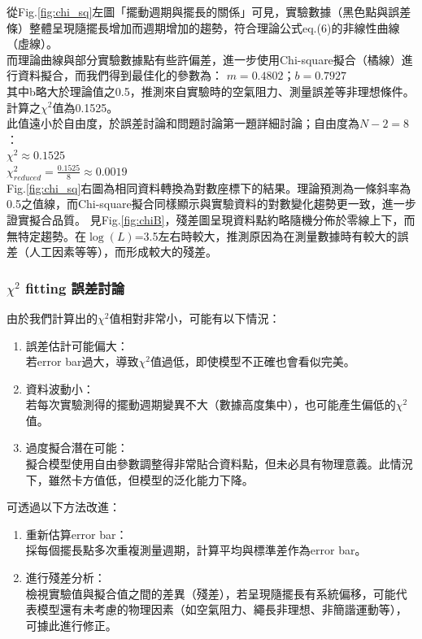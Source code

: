 \documentclass[12pt,a4paper]{article}
\begin{document}
\begin{CJK}{UTF8}{bkai}
\indent 從Fig.\ref{fig:chi_sq}左圖「擺動週期與擺長的關係」可見，實驗數據（黑色點與誤差條）整體呈現隨擺長增加而週期增加的趨勢，符合理論公式eq.(6)的非線性曲線（虛線）。\\
\indent 而理論曲線與部分實驗數據點有些許偏差，進一步使用Chi-square擬合（橘線）進行資料擬合，而我們得到最佳化的參數為：
   $ m=0.4802$；$b=0.7927$\\
\indent 其中b略大於理論值之0.5，推測來自實驗時的空氣阻力、測量誤差等非理想條件。\\
\indent 計算之$\chi^2$值為0.1525。\\
此值遠小於自由度，於誤差討論和問題討論第一題詳細討論；自由度為$N-2=8$：\\
\indent $\chi^2 \approx 0.1525$\\
\indent $\chi_{reduced}^2=\frac{0.1525}{8} \approx 0.0019$\\

\indent Fig.\ref{fig:chi_sq}右圖為相同資料轉換為對數座標下的結果。理論預測為一條斜率為0.5之值線，而Chi-square擬合同樣顯示與實驗資料的對數變化趨勢更一致，進一步證實擬合品質。
\indent 見Fig.\ref{fig:chiB}，殘差圖呈現資料點約略隨機分佈於零線上下，而無特定趨勢。在$\log(L)$=3.5左右時較大，推測原因為在測量數據時有較大的誤差（人工因素等等），而形成較大的殘差。

\subsubsection{$\chi^2$ fitting 誤差討論}
\hfill

\indent 由於我們計算出的$\chi^2$值相對非常小，可能有以下情況：\\

\begin{enumerate}
    \item 誤差估計可能偏大：\\
    若error bar過大，導致$\chi^2$值過低，即使模型不正確也會看似完美。
    \item 資料波動小：\\若每次實驗測得的擺動週期變異不大（數據高度集中），也可能產生偏低的$\chi^2$值。
    \item 過度擬合潛在可能：\\擬合模型使用自由參數調整得非常貼合資料點，但未必具有物理意義。此情況下，雖然卡方值低，但模型的泛化能力下降。
\end{enumerate}

\indent 可透過以下方法改進：
\begin{enumerate}
    \item 重新估算error bar：\\採每個擺長點多次重複測量週期，計算平均與標準差作為error bar。
    \item 進行殘差分析：\\檢視實驗值與擬合值之間的差異（殘差），若呈現隨擺長有系統偏移，可能代表模型還有未考慮的物理因素（如空氣阻力、繩長非理想、非簡諧運動等），可據此進行修正。
\end{enumerate}



\end{CJK}
\end{document}
